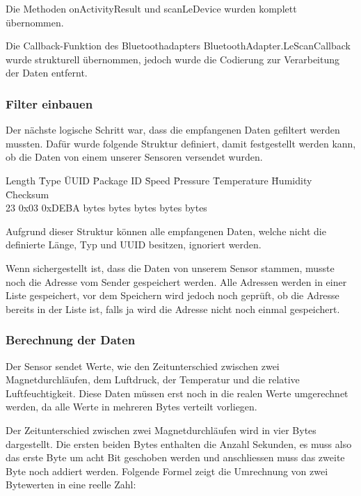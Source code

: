 Die Methoden onActivityResult und scanLeDevice wurden komplett übernommen.

Die Callback-Funktion des Bluetoothadapters BluetoothAdapter.LeScanCallback wurde strukturell übernommen, jedoch wurde die Codierung zur Verarbeitung der Daten entfernt.

\subsubsection{Filter einbauen}
Der nächste logische Schritt war, dass die empfangenen Daten gefiltert werden mussten. Dafür wurde folgende Struktur definiert, damit festgestellt werden kann, ob die Daten von einem unserer Sensoren versendet wurden.

\begin{tabbing}
   Length	\quad\= Type	\quad\= UUID 	\quad\= Package ID	\quad\= Speed	\quad\= Pressure	\quad\= Temperature	\quad\= Humidity	\quad\= Checksum   \\[0.8ex]
   23	\> 0x03	\> 0xDEBA  bytes bytes bytes bytes bytes \\
\end{tabbing}
Aufgrund dieser Struktur können alle empfangenen Daten, welche nicht die definierte Länge, Typ und UUID besitzen, ignoriert werden.

Wenn sichergestellt ist, dass die Daten von unserem Sensor stammen, musste noch die Adresse vom Sender gespeichert werden. Alle Adressen werden in einer Liste gespeichert, vor dem Speichern wird jedoch noch geprüft, ob die Adresse bereits in der Liste ist, falls ja wird die Adresse nicht noch einmal gespeichert.

\subsubsection{Berechnung der Daten}

Der Sensor sendet Werte, wie den Zeitunterschied zwischen zwei Magnetdurchläufen, dem Luftdruck, der Temperatur und die relative Luftfeuchtigkeit. Diese Daten müssen erst noch in die realen Werte umgerechnet werden, da alle Werte in mehreren Bytes verteilt vorliegen.

Der Zeitunterschied zwischen zwei Magnetdurchläufen wird in vier Bytes dargestellt. Die ersten beiden Bytes enthalten die Anzahl Sekunden, es muss also das erste Byte um acht Bit geschoben werden und anschliessen muss das zweite Byte noch addiert werden. Folgende Formel zeigt die Umrechnung von zwei Bytewerten in eine reelle Zahl:

